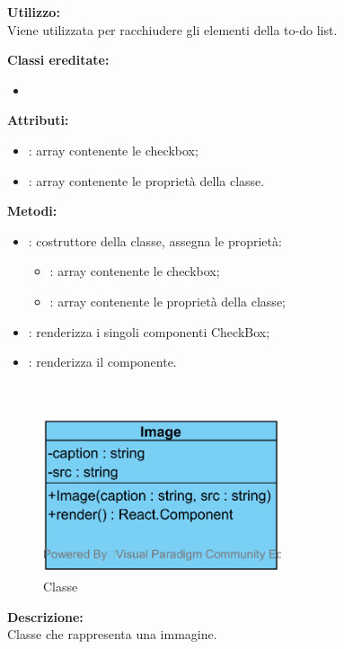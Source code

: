 \textbf{Utilizzo:}\\
Viene utilizzata per racchiudere gli elementi della to-do list.

\textbf{Classi ereditate:}
\begin{itemize}
	\item {}
\end{itemize}


\textbf{Attributi:}
\begin{itemize}
	\item {}: array contenente le checkbox;
	\item {}: array contenente le proprietà della classe.
\end{itemize}

\textbf{Metodi:}
\begin{itemize}
	\item {}: costruttore della classe, assegna le proprietà:
	\begin{itemize}
		\item {}: array contenente le checkbox;
		\item {}: array contenente le proprietà della classe;
	\end{itemize}
	\item {}: renderizza i singoli componenti CheckBox;
	\item {}: renderizza il componente.
\end{itemize}

\paragraph[::Image]{\class}\mbox{}\\ \label{\class}
\begin{figure}[H]
	\centering
	\includegraphics[width=7cm]{./diagrammi/framework/view/gui/image.png}
	\caption{Classe \class}
\end{figure}
\textbf{Descrizione:}\\
Classe che rappresenta una immagine.


